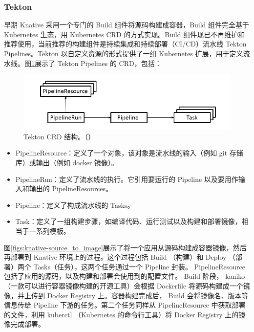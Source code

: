 \documentclass[11pt]{article}
\begin{document}
\subsubsection{Tekton} \label{Tekton}
早期 Knative 采用一个专门的 Build 组件将源码构建成容器，Build 组件完全基于 Kubernetes 生态，用 Kubernetes CRD 的方式实现。Build 组件现已不再维护和推荐使用，当前推荐的构建组件是持续集成和持续部署（CI/CD）流水线 Tekton Pipelines。Tekton 以自定义资源的形式提供了一组 Kubernetes 扩展，用于定义流水线。图\ref{figs:knative-TektonPipeline}展示了 Tekton Pipelines 的 CRD\cite{knative-TektonPipeline}，包括：
\begin{figure}[!htbp]
	\centering
	\includegraphics[width=0.8\linewidth]{figs/knative-TektonPipeline}
	\caption{Tekton CRD 结构。（\cite{knative-TektonPipeline}）}
	\label{figs:knative-TektonPipeline}
\end{figure}
\begin{itemize}
	\item PipelineResource：定义了一个对象，该对象是流水线的输入（例如 git 存储库）或输出（例如 docker 镜像）。
	\item PipelineRun：定义了流水线的执行。它引用要运行的 Pipeline 以及要用作输入和输出的 PipelineResources。
	\item Pipeline：定义了构成流水线的 Tasks。
	\item Task：定义了一组构建步骤，如编译代码、运行测试以及构建和部署镜像，相当于一系列模板。
\end{itemize}

图\ref{figs:knative-source_to_image}展示了将一个应用从源码构建成容器镜像，然后再部署到 Knative 环境上的过程\cite{knative-source_to_image}。这个过程包括 Build （构建）和 Deploy （部署）两个 Tasks（任务），这两个任务通过一个 Pipeline 封装。 PipelineResource 包括了应用的源码，以及构建和部署会使用到的配置文件。 Build 阶段， kaniko （一款可以进行容器镜像构建的开源工具）会根据 Dockerfile 将源码构建成一个镜像，并上传到 Docker Registry 上。容器构建完成后， Build 会将镜像名、版本等信息传给 Pipeline 下游的任务。第二个任务同样从 PipelineResource 中获取部署的文件，利用 kuberctl （Kubernetes 的命令行工具）将 Docker Registry 上的镜像完成部署。
\end{document}
